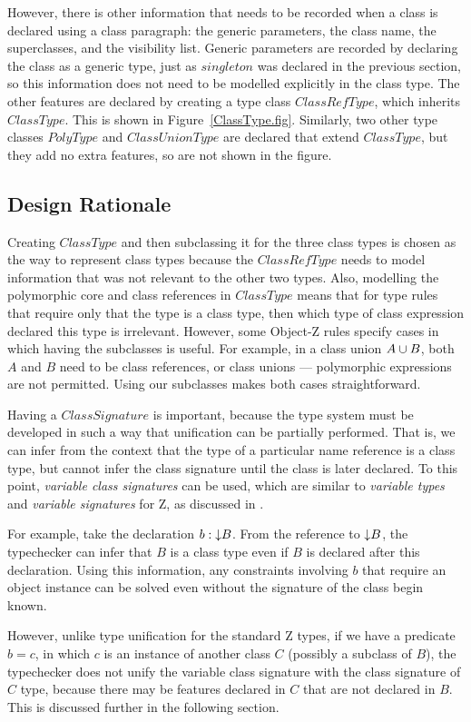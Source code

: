 However, there is other information that needs to be recorded when a
class is declared using a class paragraph: the generic parameters, the
class name, the superclasses, and the visibility list. Generic
parameters are recorded by declaring the class as a generic type, just
as $singleton$ was declared in the previous section, so this
information does not need to be modelled explicitly in the class
type. The other features are declared by creating a type class
$ClassRefType$, which inherits $ClassType$. This is shown in
Figure~\ref{ClassType.fig}. Similarly, two other type classes
$PolyType$ and $ClassUnionType$ are declared that extend $ClassType$,
but they add no extra features, so are not shown in the figure.

\subsection{Design Rationale}

Creating $ClassType$ and then subclassing it for the three class types
is chosen as the way to represent class types because the
$ClassRefType$ needs to model information that was not relevant to
the other two types. Also, modelling the polymorphic core and class
references in $ClassType$ means that for type rules that require only
that the type is a class type, then which type of class expression declared
this type is irrelevant.
However, some Object-Z rules specify cases in which having the
subclasses is useful. For example, in a class union $A \classuni B$,
both $A$ and $B$ need to be class references, or class unions ---
polymorphic expressions are not permitted. Using our subclasses makes
both cases straightforward.

Having a $ClassSignature$ is important, because the type system must
be developed in such a way that unification can be partially
performed. That is, we can infer from the context that the type of a
particular name reference is a class type, but cannot infer the class
signature until the class is later declared.  To this point, {\em
variable class signatures} can be used, which are similar to {\em
variable types} and {\em variable signatures} for Z, as discussed in
\cite{toyn00}. 

For example, take the declaration $b : \mathord\downarrow B$. From the reference to
$\mathord\downarrow B$, the typechecker can infer that $B$ is a class type even if
$B$ is declared after this declaration. Using this information, any constraints
involving $b$ that require an object instance can be solved even
without the signature of the class begin known.

However, unlike type unification for the standard Z types, if we have
a predicate $b = c$, in which $c$ is an instance of another class $C$
(possibly a subclass of $B$), the typechecker does not unify the
variable class signature with the class signature of $C$ type, because
there may be features declared in $C$ that are not declared in
$B$. This is discussed further in the following section.
